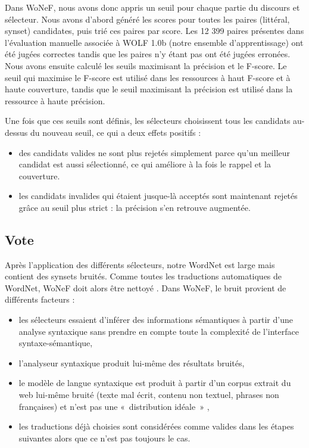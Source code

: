 Dans WoNeF, nous avons donc appris un seuil pour chaque partie du discours et
sélecteur. Nous avons d'abord généré les scores pour toutes les paires
(littéral, synset) candidates, puis trié ces paires par score. Les 12 399
paires présentes dans l'évaluation manuelle associée à WOLF 1.0b (notre
ensemble d'apprentissage) ont été jugées correctes tandis que les paires n'y
étant pas ont été jugées erronées. Nous avons ensuite calculé les seuils
maximisant la précision et le F-score. Le seuil qui maximise le F-score est
utilisé dans les ressources à haut F-score et à haute couverture, tandis que le
seuil maximisant la précision est utilisé dans la ressource à haute précision.

Une fois que ces seuils sont définis, les sélecteurs choisissent tous les
candidats au-dessus du nouveau seuil, ce qui a deux effets positifs :

\begin{itemize}

    \item des candidats valides ne sont plus rejetés simplement parce qu'un
        meilleur candidat est aussi sélectionné, ce qui améliore à la fois le
        rappel et la couverture.

    \item les candidats invalides qui étaient jusque-là acceptés sont
        maintenant rejetés grâce au seuil plus strict : la précision s'en
        retrouve augmentée.

\end{itemize}

\subsection{Vote}
\label{subsec:voting}

Après l'application des différents sélecteurs, notre WordNet est large mais
contient des synsets bruités. Comme toutes les traductions automatiques de
WordNet, WoNeF doit alors être nettoyé \citep{sagot2012cleaning}. Dans WoNeF,
le bruit provient de différents facteurs :

\begin{itemize}

    \item les sélecteurs essaient d'inférer des informations sémantiques à
        partir d'une analyse syntaxique sans prendre en compte toute la
        complexité de l'interface syntaxe-sémantique,

    \item l'analyseur syntaxique produit lui-même des résultats bruités,

    \item le modèle de langue syntaxique est produit à partir d'un corpus
        extrait du web lui-même bruité (texte mal écrit, contenu non textuel,
        phrases non françaises) et n'est pas une «~distribution idéale~»
        \citep{copestake2013lexicalised},

    \item les traductions déjà choisies sont considérées comme valides dans les
        étapes suivantes alors que ce n'est pas toujours le cas.

\end{itemize}

